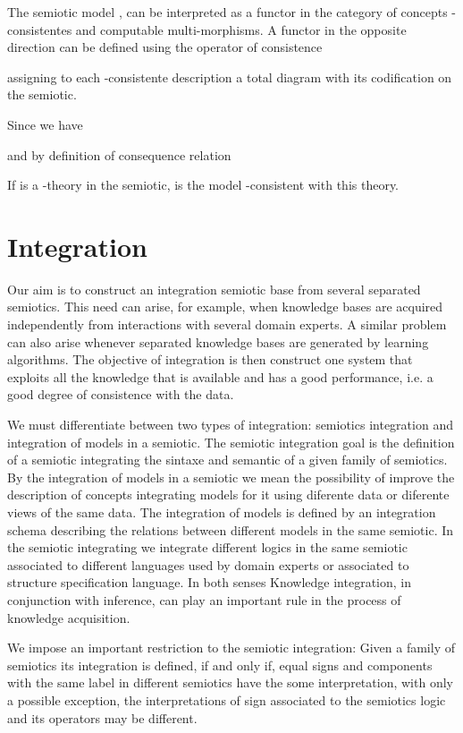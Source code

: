 \documentclass[oribibl]{llncs}
\begin{document}
The semiotic model , can be interpreted as a functor 
in the category of concepts -consistentes and computable multi-morphisms. A functor in the opposite direction can be defined using  the operator of consistence

assigning to each -consistente description a total diagram with its codification on the semiotic.

Since  we have

and by definition of consequence relation


If  is a -theory in the semiotic,  is the model -consistent with this theory.

\section{Integration}\label{integration}
Our aim is to construct an integration semiotic base from several separated semiotics. This need can arise, for example, when knowledge bases are acquired independently from interactions with several domain experts. A similar problem can also arise whenever separated knowledge bases are generated by learning algorithms.  The objective of integration is then construct one system that exploits all the knowledge that is available and has a good performance, i.e. a good degree of consistence with the data.

We must differentiate between two types of integration: semiotics integration and integration of models in a semiotic. The semiotic integration goal is the definition of a semiotic integrating the sintaxe and semantic of a given family of semiotics. By the integration of models in a semiotic we mean the possibility of improve the description of concepts integrating models for it using diferente data or diferente views of the same data. The integration of models is defined by an integration schema describing the relations between different models in the same semiotic. In the semiotic integrating we integrate different logics in the same semiotic associated to different languages used by domain experts or associated to structure specification language. In both senses Knowledge integration, in conjunction with inference, can play an important rule in the process of knowledge acquisition.

We impose an important restriction to the semiotic integration: Given a family of semiotics  its integration is defined, if and only if, equal signs and components with the same label in different semiotics have the some interpretation, with only a possible exception, the interpretations of sign  associated to the semiotics logic and its operators may be different.
\end{document}
